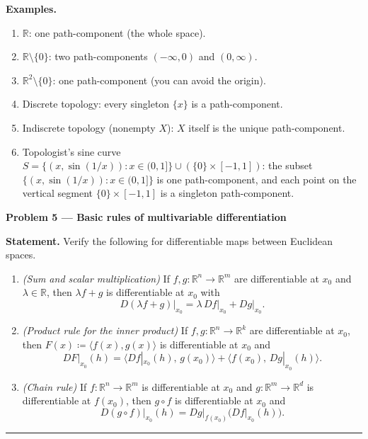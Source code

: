 \documentclass[12pt,a4paper]{article}
\theoremstyle{plain}
\theoremstyle{definition}
\theoremstyle{remark}
\theoremstyle{remark}
\newcommand{\probheader}[1]{%
	\par\vspace{8pt}%
	{\Large\bfseries #1\par}%
	\vspace{6pt}%
}
\newcommand{\sep}{\vspace{6pt}\hrule\vspace{8pt}}
\begin{document}
\medskip
\noindent\textbf{Examples.}
\begin{enumerate}
	\item $\mathbb{R}$: one path-component (the whole space).
	\item $\mathbb{R}\setminus\{0\}$: two path-components $(-\infty,0)$ and $(0,\infty)$.
	\item $\mathbb{R}^2\setminus\{0\}$: one path-component (you can avoid the origin).
	\item Discrete topology: every singleton $\{x\}$ is a path-component.
	\item Indiscrete topology (nonempty $X$): $X$ itself is the unique path-component.
	\item Topologist's sine curve
	$S=\{(x,\sin(1/x)):x\in(0,1]\}\cup(\{0\}\times[-1,1])$:
	the subset $\{(x,\sin(1/x)):x\in(0,1]\}$ is one path-component, and
	each point on the vertical segment $\{0\}\times[-1,1]$ is a singleton path-component.
\end{enumerate}


\probheader{Problem 5 — Basic rules of multivariable differentiation}

\textbf{Statement.}
Verify the following for differentiable maps between Euclidean spaces.

\begin{enumerate}[label=(\alph*), leftmargin=1.2cm]
	\item \emph{(Sum and scalar multiplication)}
	If \(f,g:\mathbb{R}^n\to\mathbb{R}^m\) are differentiable at \(x_0\)
	and \(\lambda\in\mathbb{R}\), then \(\lambda f+g\) is differentiable at \(x_0\) with
	\[
	D(\lambda f+g)\big|_{x_0}
	= \lambda\,Df\big|_{x_0} + Dg\big|_{x_0}.
	\]
	
	\item \emph{(Product rule for the inner product)}
	If \(f,g:\mathbb{R}^n\to\mathbb{R}^k\) are differentiable at \(x_0\), then
	\(F(x)\coloneqq\langle f(x),g(x)\rangle\) is differentiable at \(x_0\) and
	\[
	DF\big|_{x_0}(h)
	= \langle Df|_{x_0}(h),\, g(x_0)\rangle
	+ \langle f(x_0),\, Dg|_{x_0}(h)\rangle .
	\]
	
	\item \emph{(Chain rule)}
	If \(f:\mathbb{R}^n\to\mathbb{R}^m\) is differentiable at \(x_0\) and
	\(g:\mathbb{R}^m\to\mathbb{R}^d\) is differentiable at \(f(x_0)\), then \(g\circ f\)
	is differentiable at \(x_0\) and
	\[
	D(g\circ f)\big|_{x_0}(h)
	= Dg\big|_{f(x_0)}\!\big(Df\big|_{x_0}(h)\big).
	\]
\end{enumerate}

\sep
\end{document}
